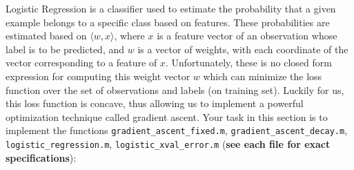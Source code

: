 \documentclass[english]{article}
\begin{document}
 Logistic Regression is a classifier used to estimate the probability that a given example belongs to a specific class based on features. These probabilities are estimated based on $\langle w,x\rangle$, where $x$ is a feature vector of an observation whose label is to be predicted, and $w$ is a vector of weights, with each coordinate of the vector corresponding to a feature of $x$. Unfortunately, these is no closed form expression for computing this weight vector $w$ which can minimize the loss function over the set of observations and labels (on training set). Luckily for us, this loss function is concave, thus allowing us to implement a powerful optimization technique called gradient ascent. Your task in this section is to implement the functions {\tt gradient\_ascent\_fixed.m}, {\tt gradient\_ascent\_decay.m}, {\tt logistic\_regression.m}, {\tt logistic\_xval\_error.m}
({\bf see each file for exact specifications}):
\end{document}
